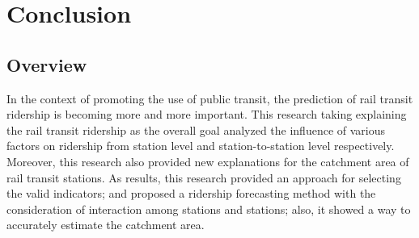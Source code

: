 \chapter{Conclusion}
%
\section{Overview}
In the context of promoting the use of public transit, the prediction of rail transit ridership is becoming more and more important. This research taking explaining the rail transit ridership as the overall goal analyzed the influence of various factors on ridership from station level and station-to-station level respectively. Moreover, this research also provided new explanations for the catchment area of rail transit stations. As results, this research provided an approach for selecting the valid indicators; and proposed a ridership forecasting method with the consideration of interaction among stations and stations; also, it showed a way to accurately estimate the catchment area.

